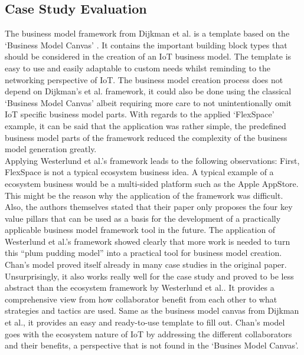 	\subsection{Case Study Evaluation}
	\vspace{-1em}
		The business model framework from Dijkman et al. \cite{dijkman} is a template based on the `Business Model Canvas' \cite{bmc}. It contains the important building block types that should be considered in the creation of an IoT business model. The template is easy to use and easily adaptable to custom needs whilst reminding to the networking perspective of IoT. The business model creation process does not depend on Dijkman's et al. framework, it could also be done using the classical `Business Model Canvas' albeit requiring more care to not unintentionally omit IoT specific business model parts.
		With regards to the applied `FlexSpace' example, it can be said that the application was rather simple, the predefined business model parts of the framework reduced the complexity of the business model generation greatly.\\
		Applying Westerlund et al.'s framework leads to the following observations: First, FlexSpace is not a typical ecosystem business idea. A typical example of a ecosystem business would be a multi-sided platform such as the Apple AppStore. This might be the reason why the application of the framework was difficult. Also, the authors themselves stated that their paper only proposes the four key value pillars that can be used as a basis for the development of a practically applicable business model framework tool in the future. The application of Westerlund et al.'s framework showed clearly that more work is needed to turn this ``plum pudding model'' \cite{westerlund} into a practical tool for business model creation.\\
		Chan's model proved itself already in many case studies in the original paper. Unsurprisingly, it also works really well for the case study and proved to be less abstract than the ecosystem framework by Westerlund et al.. It provides a comprehensive view from how collaborator benefit from each other to what strategies and tactics are used. Same as the business model canvas from Dijkman et al., it provides an easy and ready-to-use template to fill out. Chan's model goes with the ecosystem nature of IoT by addressing the different collaborators and their benefits, a perspective that is not found in the `Busines Model Canvas'.\\
